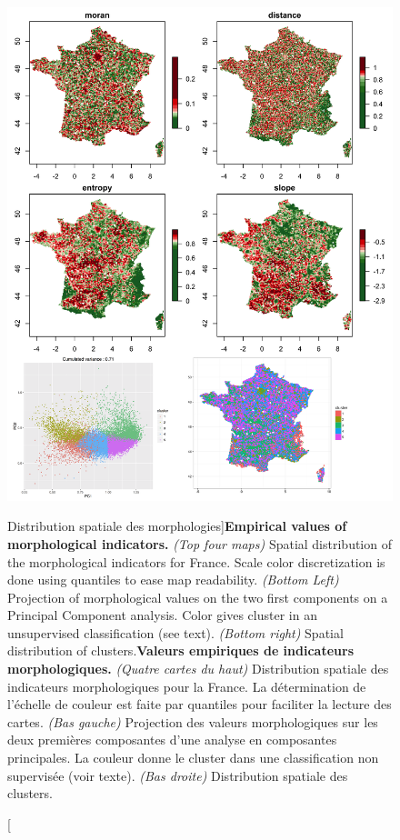 \begin{figure}
\includegraphics[width=0.9\linewidth]{Figures/Density/Fig1}
\caption[Empirical values of morphological indicators][Distribution spatiale des morphologies]{\textbf{Empirical values of morphological indicators.} \textit{(Top four maps)} Spatial distribution of the morphological indicators for France. Scale color discretization is done using quantiles to ease map readability. \textit{(Bottom Left)} Projection of morphological values on the two first components on a Principal Component analysis. Color gives cluster in an unsupervised classification (see text). \textit{(Bottom right)} Spatial distribution of clusters.}{\textbf{Valeurs empiriques de indicateurs morphologiques.} \textit{(Quatre cartes du haut)} Distribution spatiale des indicateurs morphologiques pour la France. La détermination de l'échelle de couleur est faite par quantiles pour faciliter la lecture des cartes. \textit{(Bas gauche)} Projection des valeurs morphologiques sur les deux premières composantes d'une analyse en composantes principales. La couleur donne le cluster dans une classification non supervisée (voir texte). \textit{(Bas droite)} Distribution spatiale des clusters.}
\label{fig:staticcorrelations:empirical}
\end{figure}



